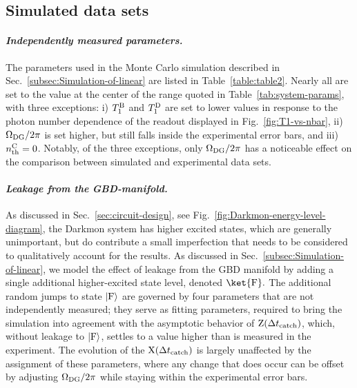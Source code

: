 \subsection{Simulated data sets}

\paragraph{\textit{\emph{Independently measured parameters.}}}

The parameters used in the Monte Carlo simulation described in Sec.~\ref{subsec:Simulation-of-linear}
are listed in Table~\ref{table:table2}. Nearly all are set to the
value at the center of the range quoted in Table~\ref{tab:system-params},
with three exceptions: i) $T_{1}^{{\rm B}}$ and $T_{1}^{{\rm D}}$
are set to lower values in response to the photon number dependence
of the readout displayed in Fig.~\ref{fig:T1-vs-nbar}, ii) $\Omega_{{\rm DG}}/2\pi$
is set higher, but still falls inside the experimental error bars,
and iii) $n_{{\rm th}}^{{\rm C}}=0$. Notably, of the three exceptions,
only $\Omega_{{\rm DG}}/2\pi$ has a noticeable effect on the comparison
between simulated and experimental data sets.

\paragraph{\textit{\emph{Leakage from the }}\emph{GBD}\textit{\emph{-manifold.}}\emph{ }}

As discussed in Sec.~\ref{sec:circuit-design}, see Fig.~\ref{fig:Darkmon-energy-level-diagram},
the Darkmon system has higher excited states, which are generally
unimportant, but do contribute a small imperfection that needs to
be considered to qualitatively account for the results. As discussed
in Sec.~\ref{subsec:Simulation-of-linear}, we model the effect of
leakage from the GBD manifold by adding a single additional higher-excited
state level, denoted $\ket{\mathrm{F}}.$ The additional random jumps
to state $|{\rm F}\rangle$ are governed by four parameters that are
not independently measured; they serve as fitting parameters, required
to bring the simulation into agreement with the asymptotic behavior
of ${\rm Z}(\Delta t_{{\rm catch}})$, which, without leakage to $|{\rm F}\rangle$,
settles to a value higher than is measured in the experiment. The
evolution of the ${\rm X}(\Delta t_{{\rm catch}})$ is largely unaffected
by the assignment of these parameters, where any change that does
occur can be offset by adjusting $\Omega_{{\rm DG}}/2\pi$ while staying
within the experimental error bars.

